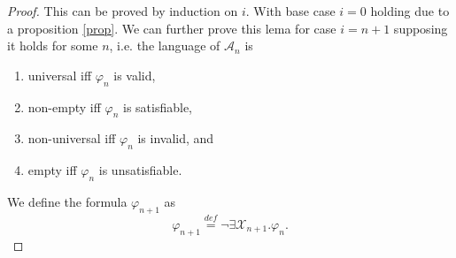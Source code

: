 \begin{proof}
 This can be proved by induction on $i$. With base case $i = 0$ holding due to a
 proposition \ref{prop}. We can further prove this lema for case $i = n + 1$
 supposing it holds for some $n$, i.e. the language of $\mathcal{A}_n$ is
 \begin{enumerate}
   \item universal iff $\varphi_n$ is valid,
   \item non-empty iff $\varphi_n$ is satisfiable,
   \item non-universal iff $\varphi_n$ is invalid, and
   \item empty iff $\varphi_n$ is unsatisfiable.
 \end{enumerate}
 
 We define the formula $\varphi_{n+1}$ as 
 \begin{equation}
 \varphi_{n+1} \overset{\mathit{def}}{=} \neg\exists\mathcal{X}_{n+1}.
 \varphi_n.
 \end{equation}
 

\end{proof}
